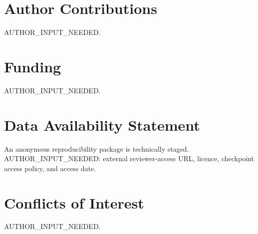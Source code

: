 \documentclass[11pt,a4paper]{article}
\begin{document}
\section*{Author Contributions}
AUTHOR\_INPUT\_NEEDED.
\section*{Funding}
AUTHOR\_INPUT\_NEEDED.
\section*{Data Availability Statement}
An anonymous reproducibility package is technically staged. AUTHOR\_INPUT\_NEEDED: external reviewer-access URL, licence, checkpoint access policy, and access date.
\section*{Conflicts of Interest}
AUTHOR\_INPUT\_NEEDED.

\end{document}
